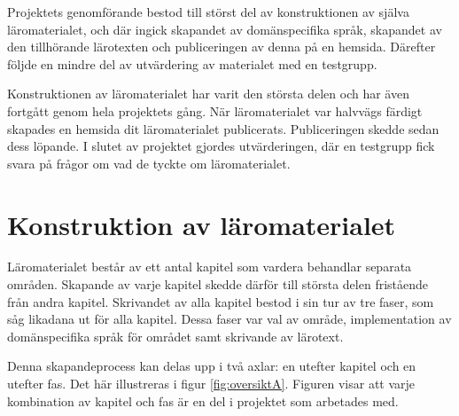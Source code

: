 \begin{binge}

Projektets genomförande bestod till störst del av konstruktionen av själva
läromaterialet, och där ingick skapandet av domänspecifika språk, skapandet av
den tillhörande lärotexten och publiceringen av denna på en hemsida. Därefter
följde en mindre del av utvärdering av materialet med en testgrupp.

Konstruktionen av läromaterialet har varit den största delen och har även
fortgått genom hela projektets gång. När läromaterialet var halvvägs färdigt
skapades en hemsida dit läromaterialet publicerats. Publiceringen skedde sedan
dess löpande. I slutet av projektet gjordes utvärderingen, där en testgrupp
fick svara på frågor om vad de tyckte om läromaterialet.

\section{Konstruktion av läromaterialet}

Läromaterialet består av ett antal kapitel som vardera behandlar separata
områden. Skapande av varje kapitel skedde därför till största delen fristående
från andra kapitel. Skrivandet av alla kapitel bestod i sin tur av tre faser,
som såg likadana ut för alla kapitel. Dessa faser var val av område,
implementation av domänspecifika språk för området samt skrivande av lärotext.

Denna skapandeprocess kan delas upp i två axlar: en utefter kapitel och en
utefter fas. Det här illustreras i figur \ref{fig:oversiktA}. Figuren visar att
varje kombination av kapitel och fas är en del i projektet som arbetades med.


\end{binge}
